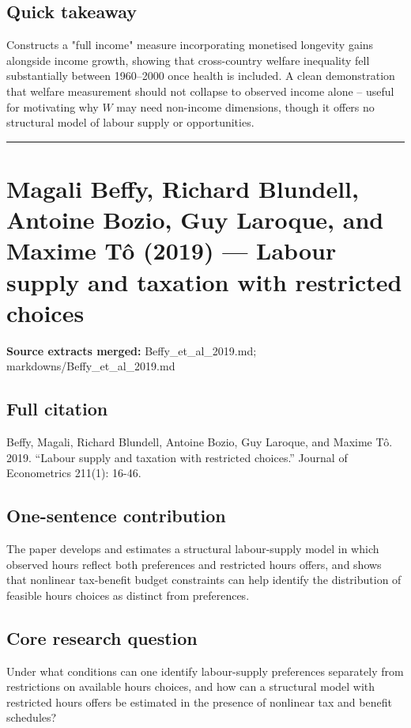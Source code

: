 \documentclass[11pt,a4paper]{article}
\begin{document}
\subsection*{Quick takeaway}
Constructs a "full income" measure incorporating monetised longevity gains alongside income growth, showing that cross-country welfare inequality fell substantially between 1960--2000 once health is included. A clean demonstration that welfare measurement should not collapse to observed income alone -- useful for motivating why $W$ may need non-income dimensions, though it offers no structural model of labour supply or opportunities.


\medskip\hrule\medskip

\section*{Magali Beffy, Richard Blundell, Antoine Bozio, Guy Laroque, and Maxime Tô (2019) — Labour supply and taxation with restricted choices}

\textbf{Source extracts merged:} Beffy\_et\_al\_2019.md; markdowns/Beffy\_et\_al\_2019.md

\subsection*{Full citation}
Beffy, Magali, Richard Blundell, Antoine Bozio, Guy Laroque, and Maxime Tô. 2019. “Labour supply and taxation with restricted choices.” Journal of Econometrics 211(1): 16-46.

\subsection*{One-sentence contribution}
The paper develops and estimates a structural labour-supply model in which observed hours reflect both preferences and restricted hours offers, and shows that nonlinear tax-benefit budget constraints can help identify the distribution of feasible hours choices as distinct from preferences.

\subsection*{Core research question}
Under what conditions can one identify labour-supply preferences separately from restrictions on available hours choices, and how can a structural model with restricted hours offers be estimated in the presence of nonlinear tax and benefit schedules?
\end{document}
